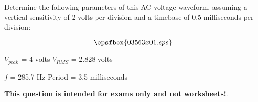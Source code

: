 

Determine the following parameters of this AC voltage waveform, assuming a vertical sensitivity of 2 volts per division and a timebase of 0.5 milliseconds per division:

$$\epsfbox{03563x01.eps}$$







$V_{peak}$ = 4 volts \hskip 100pt $V_{RMS}$ = 2.828 volts

\vskip 10pt

$f$ = 285.7 Hz \hskip 100pt Period = 3.5 milliseconds







{\bf This question is intended for exams only and not worksheets!}.



